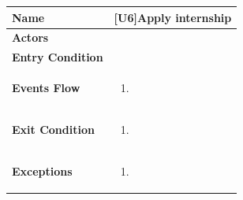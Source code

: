\begin{center}
    \begin{tabular}{|p{9em}|p{27em}|}
        \hline
        \rowcolor{bluepoli!40} %
        \textbf{Name} & \textbf{[U6]Apply internship} \\
        \hline
        \textbf{Actors} &  \\
        \hline
        \textbf{Entry Condition} &  \\
        \hline
        \textbf{Events Flow} & 
        \begin{enumerate}
            \item 
        \end{enumerate} \\
        \hline
        \textbf{Exit Condition} & 
        \begin{enumerate}
            \item 
        \end{enumerate} \\
        \hline
        \textbf{Exceptions} &
        \begin{enumerate}
            \item
        \end{enumerate} \\
        \hline
    \end{tabular}
\end{center}

